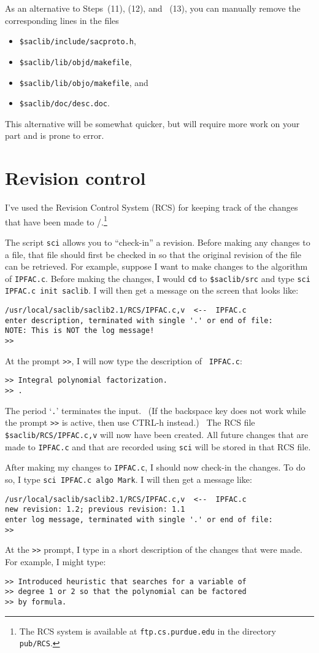 As an alternative to Steps~(11), (12), and ~(13), you can
manually remove the corresponding lines in the files
\begin{itemize}
\item[] \verb|$saclib/include/sacproto.h|,
\item[] \verb|$saclib/lib/objd/makefile|,
\item[] \verb|$saclib/lib/objo/makefile|, and
\item[] \verb|$saclib/doc/desc.doc|.
\end{itemize}
This alternative will be somewhat quicker, but will require more
work on your part and is prone to error.




\section{Revision control} \label{section:rcs}

I've used the Revision Control System (RCS) for keeping track of
the changes that have been made to \SACLIB/.\footnote{The RCS
system is available at {\tt ftp.cs.purdue.edu} in the directory
{\tt pub/RCS}.}

The script {\tt sci} allows you to ``check-in'' a revision.
Before making any changes to a file, that file should first be
checked in so that the original revision of the file can be
retrieved.
For example, suppose I want to make changes to the algorithm of
{\tt IPFAC.c}.  Before making the changes, I would {\tt cd} to
{\tt \$saclib/src} and type {\tt sci IPFAC.c init saclib}.  I
will then get a message on the screen that looks like:
\begin{verbatim}
/usr/local/saclib/saclib2.1/RCS/IPFAC.c,v  <--  IPFAC.c
enter description, terminated with single '.' or end of file:
NOTE: This is NOT the log message!
>>
\end{verbatim}
At the prompt {\tt >>}, I will now type the description of {\tt
IPFAC.c}:
\begin{verbatim}
>> Integral polynomial factorization.
>> .
\end{verbatim}
The period `{\tt .}' terminates the input. \ (If the
backspace key does not work while the prompt {\tt >>} is active,
then use CTRL-h instead.) \
The RCS file {\tt \$saclib/RCS/IPFAC.c,v} will now have been
created.
All future changes that are made to {\tt IPFAC.c} and that are
recorded using {\tt sci} will be stored in that RCS file.


After making my changes to {\tt IPFAC.c}, I should now check-in
the changes.
To do so, I type {\tt sci IPFAC.c algo Mark}.  I will then get a
message like:
\begin{verbatim}
/usr/local/saclib/saclib2.1/RCS/IPFAC.c,v  <--  IPFAC.c
new revision: 1.2; previous revision: 1.1
enter log message, terminated with single '.' or end of file:
>>
\end{verbatim}
At the {\tt >>} prompt, I type in a short description of the
changes that were made.
For example, I might type:
\begin{verbatim}
>> Introduced heuristic that searches for a variable of
>> degree 1 or 2 so that the polynomial can be factored
>> by formula.
\end{verbatim}

